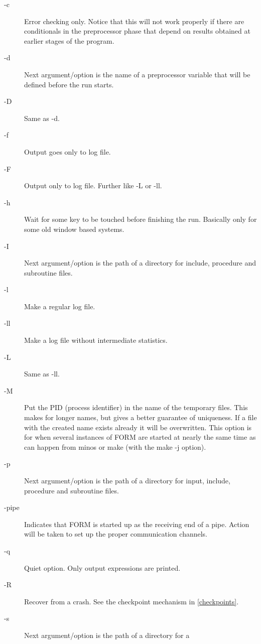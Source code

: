 \begin{description}
\item[-c] Error checking only. Notice that this will not work 
     properly if there are conditionals in the preprocessor phase that 
     depend on results obtained at earlier stages of the program.
\item[-d] Next argument/option is the name of a preprocessor 
     variable that will be defined before the run starts.
\item[-D] Same as -d.
\item[-f] Output goes only to log file.
\item[-F] Output only to log file. Further like -L or -ll.
\item[-h] Wait for some key to be touched before finishing the run.
     Basically only for some old window based systems.
\item[-I] Next argument/option is the path of a directory for 
     include, procedure and subroutine files.
\item[-l] Make a regular log file.
\item[-ll] Make a log file without intermediate statistics.
\item[-L] Same as -ll.
\item[-M] Put the PID (process identifier) in the name of the temporary 
     files. This makes for longer names, but gives a better guarantee of 
     uniqueness. If a file with the created name exists already it will be 
     overwritten. This option is for when several instances of FORM are 
     started at nearly the same time as can happen from minos or make (with 
     the make -j option).
\item[-p] Next argument/option is the path of a directory for 
     input, include, procedure and subroutine files.
\item[-pipe] Indicates that FORM is started up as the receiving 
     end of a pipe. Action will be taken to set up the proper communication 
     channels.
\item[-q] Quiet option. Only output expressions are printed.
\item[-R] Recover from a crash. See the checkpoint mechanism in 
     \ref{checkpoints}.
\item[-s] Next argument/option is the path of a directory for a 

\end{description}
